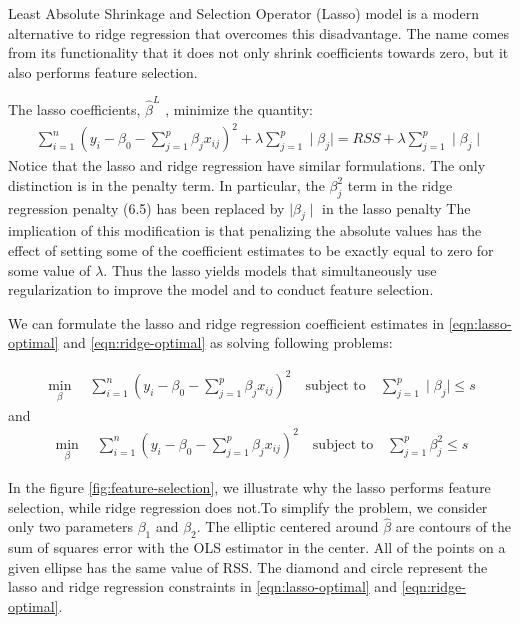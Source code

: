\noindent Least Absolute Shrinkage and Selection Operator (Lasso)
\parencite{tibshirani1996regression} model is a modern
alternative to ridge regression that overcomes this disadvantage. The name comes
from its functionality that it does not only shrink coefficients towards zero,
but it also performs feature selection.


The lasso  coefficients, $\hat{\beta}^L$ , minimize the quantity:
\begin{eqnarray}
    \label{eqn:lasso-optimal}
    \sum_{i=1}^{n}(y_i -\beta_0 - \sum_{j=1}^{p}\beta_j x_{ij}) ^ 2 + \lambda
    \sum_{j=1}^{p} \mid \beta_{j} \mid= RSS + \lambda \sum_{j=1}^{p} \mid \beta_{j} \mid
\end{eqnarray}
Notice that the lasso and ridge regression have similar formulations. The only distinction is in the penalty term. In particular, the $\beta_j^2$ term in the ridge regression penalty (6.5) has been replaced by $\mid \beta_{j} \mid$ in the lasso penalty
The implication of this modification is that penalizing the absolute values has the effect of setting some of the coefficient estimates to be exactly equal to zero for some value of $\lambda$. Thus the lasso yields models that simultaneously use regularization to improve the model and to conduct feature selection.

We can formulate the lasso and ridge regression coefficient estimates in
\ref{eqn:lasso-optimal} and \ref{eqn:ridge-optimal} as solving following
problems:

\begin{equation}
    \label{eqn:ridge-optimal}
    \begin{aligned}
    \min_{\beta} \quad \sum_{i=1}^{n}(y_i -\beta_0 - \sum_{j=1}^{p}\beta_j
    x_{ij}) ^ 2  \quad \textrm{subject to} \quad \sum_{j=1}^{p}\mid\beta_j\mid
    \leq s
    \end{aligned}
\end{equation}
and
\begin{equation}
    \label{eqn:lass-optimal}
    \begin{aligned}
    \min_{\beta} \quad \sum_{i=1}^{n}(y_i -\beta_0 - \sum_{j=1}^{p}\beta_j
    x_{ij}) ^ 2  \quad \textrm{subject to} \quad \sum_{j=1}^{p}\beta_j^2\leq s
    \end{aligned}
\end{equation}

In the figure \ref{fig:feature-selection}, we illustrate why the lasso performs
feature selection, while ridge regression does not.To simplify the problem, we
consider only two parameters $\beta_1$ and $\beta_2$.
The elliptic centered around $\hat{\beta}$ are contours of the sum of squares
error with the OLS estimator in the center. All of the points on a given ellipse
has the same value of RSS. The diamond and circle represent the lasso and ridge
regression constraints in \ref{eqn:lasso-optimal} and \ref{eqn:ridge-optimal}.

